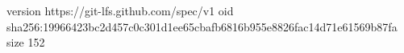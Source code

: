 version https://git-lfs.github.com/spec/v1
oid sha256:19966423bc2d457c0c301d1ee65cbafb6816b955e8826fac14d71e61569b87fa
size 152
